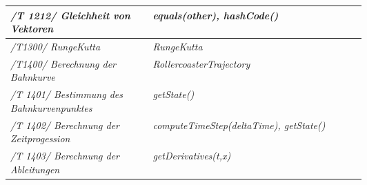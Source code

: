 \begin{longtable}{|p{.3\linewidth}|p{0.6\linewidth}|}
\textit{ /T 1212/ Gleichheit von Vektoren} &  \textit{equals(other), hashCode()}\\\hline

 \textit{/T1300/ RungeKutta} &  \textit{RungeKutta}\\\hline

\textit{/T1400/ Berechnung der Bahnkurve} &  \textit{RollercoasterTrajectory}\\\hline

\textit{ /T 1401/ Bestimmung des Bahnkurvenpunktes} &  \textit{getState()}\\\hline

\textit{ /T 1402/ Berechnung der Zeitprogession} & \textit{computeTimeStep(deltaTime), getState()}\\\hline

\textit{ /T 1403/ Berechnung der Ableitungen} &  \textit{getDerivatives(t,x)}\\\hline



\end{longtable}